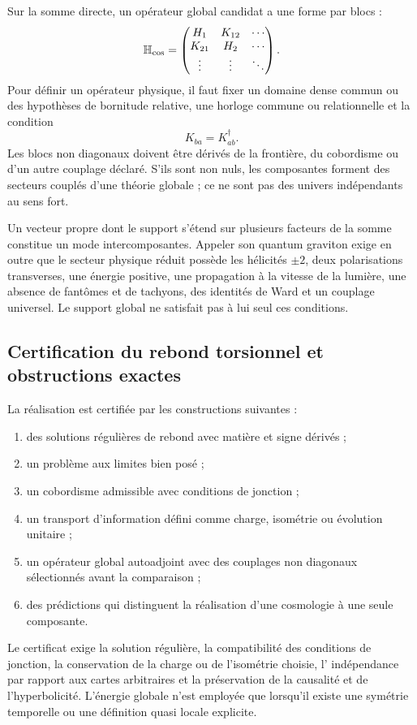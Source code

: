 Sur la somme directe, un opérateur global candidat a une forme par blocs :
\[
 \mathbb H_{\rm cos}
 =
 \begin{pmatrix}
 H_1&K_{12}&\cdots\\
 K_{21}&H_2&\cdots\\
 \vdots&\vdots&\ddots
 \end{pmatrix}.
\]
Pour définir un opérateur physique, il faut fixer un domaine dense commun ou des
hypothèses de bornitude relative, une horloge commune ou relationnelle et la condition
\[
 K_{ba}=K_{ab}^{\dagger}.
\]
Les blocs non diagonaux doivent être dérivés de la frontière, du cobordisme ou
d'un autre couplage déclaré. S'ils sont non nuls, les composantes forment des
secteurs couplés d'une théorie globale ; ce ne sont pas des univers indépendants au
sens fort.

Un vecteur propre dont le support s'étend sur plusieurs facteurs de la somme constitue un mode
intercomposantes. Appeler son quantum graviton exige en outre que le secteur
physique réduit possède les hélicités \(\pm2\), deux polarisations transverses,
une énergie positive, une propagation à la vitesse de la lumière, une absence de fantômes et de tachyons,
des identités de Ward et un couplage universel. Le support global ne
satisfait pas à lui seul ces conditions.

\subsection{Certification du rebond torsionnel et obstructions exactes}
\label{sec:condiciones-prueba-cosmologia-hmt}

La réalisation est certifiée par les constructions suivantes :
\begin{enumerate}
 \item des solutions régulières de rebond avec matière et signe dérivés ;
 \item un problème aux limites bien posé ;
 \item un cobordisme admissible avec conditions de jonction ;
 \item un transport d'information défini comme charge, isométrie ou
 évolution unitaire ;
 \item un opérateur global autoadjoint avec des couplages non diagonaux
 sélectionnés avant la comparaison ;
 \item des prédictions qui distinguent la réalisation d'une cosmologie à une
 seule composante.
\end{enumerate}

Le certificat exige la solution régulière, la compatibilité des
conditions de jonction, la conservation de la charge ou de l'isométrie choisie, l'
indépendance par rapport aux cartes arbitraires et la préservation de la causalité
et de l'hyperbolicité. L'énergie globale n'est employée que lorsqu'il existe une
symétrie temporelle ou une définition quasi locale explicite.
